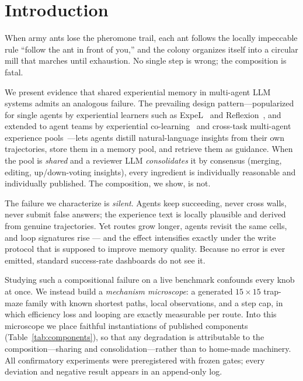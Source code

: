 \documentclass[11pt]{article}
\begin{document}
\section{Introduction}

When army ants lose the pheromone trail, each ant follows the locally impeccable rule
``follow the ant in front of you,'' and the colony organizes itself into a circular mill that
marches until exhaustion. No single step is wrong; the composition is fatal.

We present evidence that shared experiential memory in multi-agent LLM systems admits an
analogous failure. The prevailing design pattern---popularized for single agents by
experiential learners such as ExpeL~\citep{zhao2024expel} and Reflexion~\citep{shinn2023reflexion},
and extended to agent teams by experiential co-learning~\citep{qian2024colearning} and
cross-task multi-agent experience pools~\citep{liu2025mael}---lets agents distill natural-language
insights from their own trajectories, store them in a memory pool, and retrieve them as guidance.
When the pool is \emph{shared} and a reviewer LLM \emph{consolidates} it by consensus
(merging, editing, up/down-voting insights), every ingredient is individually reasonable and
individually published. The composition, we show, is not.

The failure we characterize is \emph{silent}. Agents keep succeeding, never cross walls, never
submit false answers; the experience text is locally plausible and derived from genuine
trajectories. Yet routes grow longer, agents revisit the same cells, and loop signatures rise
--- and the effect intensifies exactly under the write protocol that is supposed to improve
memory quality. Because no error is ever emitted, standard success-rate dashboards do not see
it.

Studying such a compositional failure on a live benchmark confounds every knob at once. We
instead build a \emph{mechanism microscope}: a generated $15\times15$ trap-maze family with
known shortest paths, local observations, and a step cap, in which efficiency loss and looping
are exactly measurable per route. Into this microscope we place faithful instantiations of
published components (Table~\ref{tab:components}), so that any degradation is attributable to
the composition---sharing and consolidation---rather than to home-made machinery. All
confirmatory experiments were preregistered with frozen gates; every deviation and negative
result appears in an append-only log.
\end{document}
